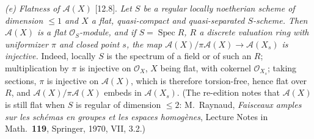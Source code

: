 \par\smallskip\noindent\textit{(e) Flatness of \(\mathcal A(X)\)} [12.8]. \emph{Let \(S\) be a
regular locally noetherian scheme of dimension \(\leq1\) and \(X\) a flat, quasi-compact and
quasi-separated \(S\)-scheme. Then \(\mathcal A(X)\) is a flat \(\mathcal O_S\)-module, and if
\(S=\operatorname{Spec}R\), \(R\) a discrete valuation ring with uniformizer \(\pi\) and closed
point \(s\), the map \(\mathcal A(X)/\pi\mathcal A(X)\to\mathcal A(X_s)\) is injective.} Indeed,
locally \(S\) is the spectrum of a field or of such an \(R\); multiplication by \(\pi\) is
injective on \(\mathcal O_X\), \(X\) being flat, with cokernel \(\mathcal O_{X_s}\); taking
sections, \(\pi\) is injective on \(\mathcal A(X)\), which is therefore torsion-free, hence flat
over \(R\), and \(\mathcal A(X)/\pi\mathcal A(X)\) embeds in \(\mathcal A(X_s)\). (The
re-edition notes that \(\mathcal A(X)\) is still flat when \(S\) is regular of dimension
\(\leq2\): M.~Raynaud, \emph{Faisceaux amples sur les sch\'emas en groupes et les espaces
homog\`enes}, Lecture Notes in Math.\ \textbf{119}, Springer, 1970, VII, 3.2.)

